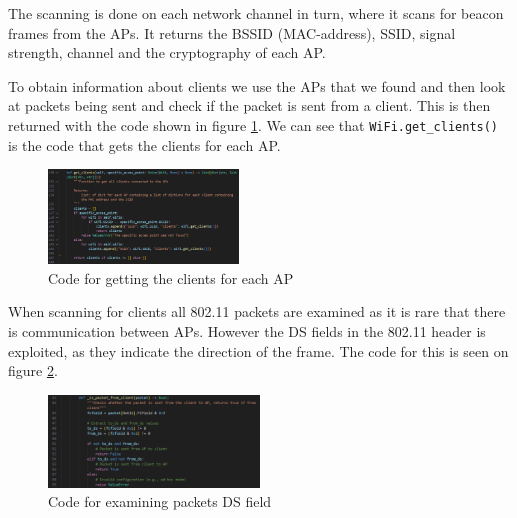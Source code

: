 The scanning is done on each network channel in turn, where it scans for beacon frames from the APs. It returns the BSSID (MAC-address), SSID, signal strength, channel and the cryptography of each AP.

To obtain information about clients we use the APs that we found and then look at packets being sent and check if the packet is sent from a client. This is then returned with the code shown in figure \ref{Scan2}. We can see that \lstinline{WiFi.get_clients()} is the code that gets the clients for each AP.
\begin{figure}[!htbp]
    \centering
    \includegraphics[width=0.45\textwidth]{Latex-Files/Billeder/Implementation/Get_Clients.png}
    \caption{Code for getting the clients for each AP}
    \label{Scan2}
\end{figure}

When scanning for clients all 802.11 packets are examined as it is rare that there is communication between APs. However the DS fields in the 802.11 header is exploited, as they indicate the direction of the frame. The code for this is seen on figure \ref{Scan3}. 

\begin{figure}[!htbp]
    \centering
    \includegraphics[width=0.5\textwidth]{Latex-Files/Billeder/Implementation/DS.png}
    \caption{Code for examining packets DS field}
    \label{Scan3}
\end{figure}


